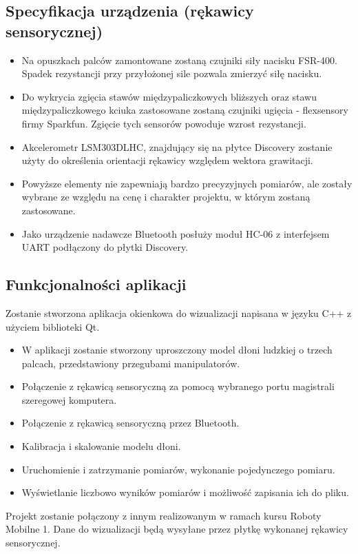 \documentclass[12pt,a4paper]{article}
\begin{document}
\subsection{Specyfikacja urządzenia (rękawicy sensorycznej)}
\begin{itemize}
\item Na opuszkach palców zamontowane zostaną czujniki siły nacisku FSR-400. Spadek rezystancji przy przyłożonej sile pozwala zmierzyć siłę nacisku.
\item Do wykrycia zgięcia stawów międzypaliczkowych bliższych oraz stawu międzypaliczkowego kciuka zastosowane zostaną czujniki ugięcia - flexsensory firmy Sparkfun. Zgięcie tych sensorów powoduje wzrost rezystancji.
\item Akcelerometr LSM303DLHC, znajdujący się na płytce Discovery zostanie użyty do określenia orientacji rękawicy względem wektora grawitacji.
\item Powyższe elementy nie zapewniają bardzo precyzyjnych pomiarów, ale zostały wybrane ze względu na cenę i charakter projektu, w którym zostaną zastosowane.
\item Jako urządzenie nadawcze Bluetooth posłuży moduł HC-06 z interfejsem UART podłączony do płytki Discovery.
\end{itemize}

\subsection{Funkcjonalności aplikacji}
Zostanie stworzona aplikacja okienkowa do wizualizacji napisana w języku C++ z użyciem biblioteki Qt.\\
\begin{itemize}
\item W aplikacji zostanie stworzony uproszczony model dłoni ludzkiej o trzech palcach, przedstawiony przegubami manipulatorów.
\item Połączenie z rękawicą sensoryczną za pomocą wybranego portu magistrali szeregowej komputera.
\item Połączenie z rękawicą sensoryczną przez Bluetooth.
\item Kalibracja i skalowanie modelu dłoni.
\item Uruchomienie i zatrzymanie pomiarów, wykonanie pojedynczego pomiaru.
\item Wyświetlanie liczbowo wyników pomiarów i możliwość zapisania ich do pliku.
\end{itemize}

Projekt zostanie połączony z innym realizowanym w ramach kursu Roboty Mobilne 1. Dane do wizualizacji będą wysyłane przez płytkę wykonanej rękawicy sensorycznej.
\end{document}
